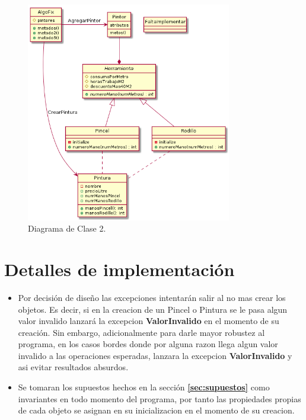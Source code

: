 \documentclass[titlepage,a4paper]{article}
\begin{document}
\begin{figure}[H]
\centering
\includegraphics[width=0.8\textwidth]{diagrama_clase01.png}
\caption{\label{fig:class02}Diagrama de Clase 2.}
\end{figure}



\section{Detalles de implementación}\label{sec:implementacion}
\begin{itemize}
  \item Por decisión de diseño las excepciones intentarán salir al no mas crear los objetos. Es decir, si en la creacion de un Pincel o Pintura se
  le pasa algun valor invalido lanzará la excepcion \textbf{ValorInvalido} en el momento de su creación. Sin embargo, adicionalmente para darle mayor robustez al programa, en los casos bordes donde por alguna razon
  llega algun valor invalido a las operaciones esperadas, lanzara la excepcion \textbf{ValorInvalido} y asi evitar resultados absurdos.
  \item Se tomaran los supuestos hechos en la sección \textbf{\ref{sec:supuestos}} como invariantes en todo momento del programa,
  por tanto las propiedades propias de cada objeto se asignan en su inicializacion en el momento de su creacion.
\end{itemize}
\end{document}
